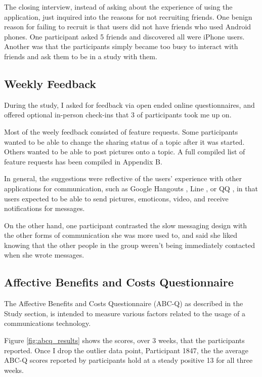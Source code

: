     The closing interview, instead of asking about the experience of using
    the application, just inquired into the reasons for not recruiting friends.
    One benign reason for failing to recruit is that users did not have friends
    who used Android phones.
    One participant asked 5 friends and discovered all were iPhone users.
    Another was that the participants simply became too busy to interact with
    friends and ask them to be in a study with them.

  \subsection{Weekly Feedback}
  During the study,
  I asked for feedback via open ended online questionnaires,
  and offered optional in-person check-ins that 3 of participants took me up on.

  Most of the weely feedback consisted of feature requests.
  Some participants wanted to be able to change the sharing status
  of a topic after it was started.
  Others wanted to be able to post pictures onto a topic.
  A full compiled list of feature requests has been compiled in Appendix B.

  In general, the suggestions were reflective of the users' experience with other
  applications for communication, such as Google Hangouts \cite{gchat},
  Line \cite{line}, or QQ \cite{QQ},
  in that users expected to be able to send pictures, emoticons, video,
  and receive notifications for messages.

  On the other hand, one participant contrasted the slow messaging design with
  the other forms of communication she was more used to,
  and said she liked knowing that the other
  people in the group weren't being immediately contacted when she wrote messages.

  \subsection{Affective Benefits and Costs Questionnaire}
  The Affective Benefits and Costs Questionnaire (ABC-Q) as described in
  the Study section, is intended to measure various factors
  related to the usage of a communications technology.
  
  Figure \ref{fig:abcq_results} shows the scores,
  over 3 weeks, that the participants reported.
  Once I drop the outlier data point, Participant 1847,
  the the average ABC-Q scores reported by participants hold at a steady positive 13
  for all three weeks.

